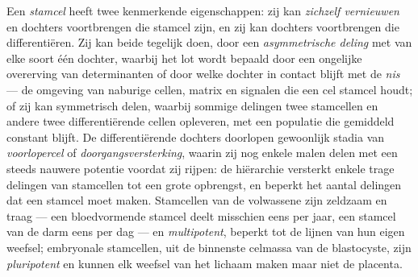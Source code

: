 \begin{definition}\label{def:b3:stem-cells:stem}
Een \emph{stamcel} heeft twee kenmerkende eigenschappen: zij kan
\emph{zichzelf vernieuwen} en dochters voortbrengen die stamcel zijn,
en zij kan dochters voortbrengen die differentiëren. Zij kan beide
tegelijk doen, door een \emph{asymmetrische deling} met van elke soort
één dochter, waarbij het lot wordt bepaald door een ongelijke
overerving van determinanten of door welke dochter in contact blijft
met de \emph{nis} --- de omgeving van naburige cellen, matrix en
signalen die een cel stamcel houdt; of zij kan symmetrisch delen,
waarbij sommige delingen twee stamcellen en andere twee differentiërende
cellen opleveren, met een populatie die gemiddeld constant blijft. De
differentiërende dochters doorlopen gewoonlijk stadia van
\emph{voorlopercel} of \emph{doorgangsversterking}, waarin zij nog
enkele malen delen met een steeds nauwere potentie voordat zij rijpen:
de hiërarchie versterkt enkele trage delingen van stamcellen tot een
grote opbrengst, en beperkt het aantal delingen dat een stamcel moet
maken. Stamcellen van de volwassene zijn zeldzaam en traag --- een
bloedvormende stamcel deelt misschien eens per jaar, een stamcel van de
darm eens per dag --- en \emph{multipotent}, beperkt tot de lijnen van
hun eigen weefsel; embryonale stamcellen, uit de binnenste celmassa van
de blastocyste, zijn \emph{pluripotent} en kunnen elk weefsel van het
lichaam maken maar niet de placenta.
\end{definition}

